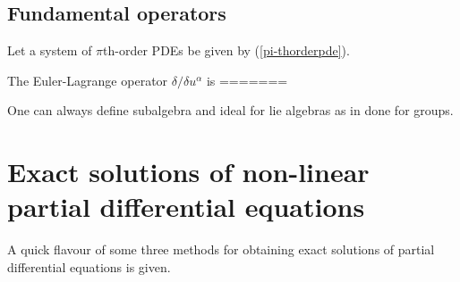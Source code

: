 \subsection{Fundamental operators}
Let a system of $\pi$th-order PDEs be given by (\ref{pi-thorderpde}).
\begin{defn} The Euler-Lagrange operator ${\delta}/{\delta u^{\alpha}}$ is 
=======
\begin{rem}
One can always define subalgebra and ideal for lie algebras as in done for groups.
\end{rem}
\section{Exact solutions of non-linear partial differential equations}
A quick flavour of some three methods for obtaining  exact solutions of partial differential equations is given.

\end{defn}
